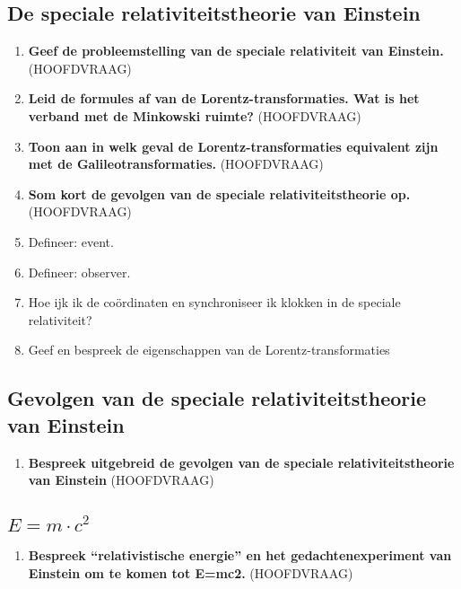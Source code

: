 \documentclass[12pt]{article}
\begin{document}
    \subsection{De speciale relativiteitstheorie van Einstein}
    \begin{enumerate}
        \item \textbf{Geef de probleemstelling van de speciale relativiteit van Einstein.} (HOOFDVRAAG)
        \item \textbf{Leid de formules af van de Lorentz-transformaties. Wat is het verband met de Minkowski ruimte?} (HOOFDVRAAG)
        \item \textbf{Toon aan in welk geval de Lorentz-transformaties equivalent zijn met de Galileotransformaties.} (HOOFDVRAAG)
        \item \textbf{Som kort de gevolgen van de speciale relativiteitstheorie op.} (HOOFDVRAAG)
        \item Defineer: event.
        \item Defineer: observer.
        \item Hoe ijk ik de coördinaten en synchroniseer ik klokken in de speciale relativiteit?
        \item Geef en bespreek de eigenschappen van de Lorentz-transformaties
    \end{enumerate}
    \subsection{Gevolgen van de speciale relativiteitstheorie van Einstein}
    \begin{enumerate}
        \item \textbf{Bespreek uitgebreid de gevolgen van de speciale relativiteitstheorie van Einstein} (HOOFDVRAAG)
    \end{enumerate}
    \subsection{$E=m \cdot c^2$}
    \begin{enumerate}
        \item \textbf{Bespreek “relativistische energie” en het gedachtenexperiment van Einstein om te komen tot E=mc2.} (HOOFDVRAAG)
    \end{enumerate}
    
\end{document}
